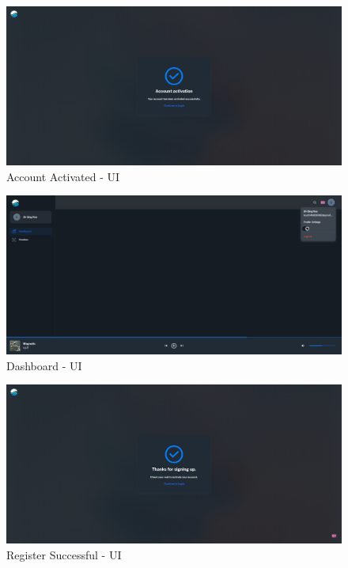 \newpage
\section{}
\label{app:appendix-e}
\begin{figure}[h!]
    \centering
    \includegraphics[width=14cm]{Images/acc-activated.png}
    \caption{Account Activated - UI}
    \label{fig:acc-activated}
\end{figure}
\begin{figure}[h!]
    \centering
    \includegraphics[width=14cm]{Images/dashboard.png}
    \caption{Dashboard - UI}
    \label{fig:dashboard}
\end{figure}
\begin{figure}[h!]
    \centering
    \includegraphics[width=14cm]{Images/register-successfull-ui.png}
    \caption{Register Successful - UI}
    \label{fig:register-succesfull}
\end{figure}
